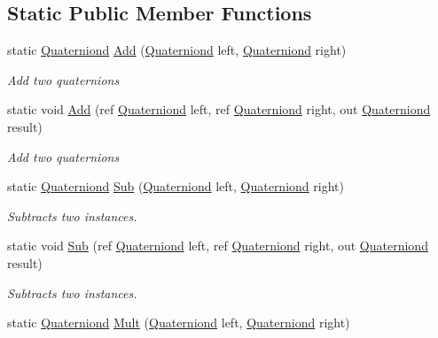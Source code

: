 \subsection*{Static Public Member Functions}
\begin{DoxyCompactItemize}
\item 
static \hyperlink{struct_open_t_k_1_1_quaterniond}{Quaterniond} \hyperlink{struct_open_t_k_1_1_quaterniond_a3719cc0d83970b0982e78c6ce1328b27}{Add} (\hyperlink{struct_open_t_k_1_1_quaterniond}{Quaterniond} left, \hyperlink{struct_open_t_k_1_1_quaterniond}{Quaterniond} right)
\begin{DoxyCompactList}\small\item\em Add two quaternions \end{DoxyCompactList}\item 
static void \hyperlink{struct_open_t_k_1_1_quaterniond_a3a71131e8b1c55fcf0d3b3c7601145de}{Add} (ref \hyperlink{struct_open_t_k_1_1_quaterniond}{Quaterniond} left, ref \hyperlink{struct_open_t_k_1_1_quaterniond}{Quaterniond} right, out \hyperlink{struct_open_t_k_1_1_quaterniond}{Quaterniond} result)
\begin{DoxyCompactList}\small\item\em Add two quaternions \end{DoxyCompactList}\item 
static \hyperlink{struct_open_t_k_1_1_quaterniond}{Quaterniond} \hyperlink{struct_open_t_k_1_1_quaterniond_ae0ef73b4870baeb922a05450d878a9a9}{Sub} (\hyperlink{struct_open_t_k_1_1_quaterniond}{Quaterniond} left, \hyperlink{struct_open_t_k_1_1_quaterniond}{Quaterniond} right)
\begin{DoxyCompactList}\small\item\em Subtracts two instances. \end{DoxyCompactList}\item 
static void \hyperlink{struct_open_t_k_1_1_quaterniond_a6a880dc13c646c5aeebc9713acd8cdf7}{Sub} (ref \hyperlink{struct_open_t_k_1_1_quaterniond}{Quaterniond} left, ref \hyperlink{struct_open_t_k_1_1_quaterniond}{Quaterniond} right, out \hyperlink{struct_open_t_k_1_1_quaterniond}{Quaterniond} result)
\begin{DoxyCompactList}\small\item\em Subtracts two instances. \end{DoxyCompactList}\item 
static \hyperlink{struct_open_t_k_1_1_quaterniond}{Quaterniond} \hyperlink{struct_open_t_k_1_1_quaterniond_ab3a7e0269edff0aa97035d59d0064160}{Mult} (\hyperlink{struct_open_t_k_1_1_quaterniond}{Quaterniond} left, \hyperlink{struct_open_t_k_1_1_quaterniond}{Quaterniond} right)

\end{DoxyCompactItemize}
